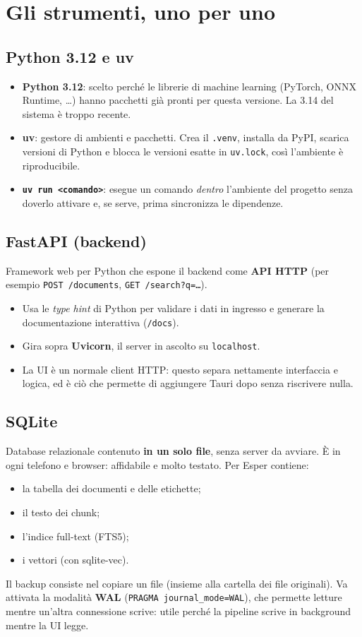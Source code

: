 \documentclass[11pt,a4paper]{article}
\newcommand{\code}[1]{\texttt{\small #1}}
\begin{document}
\section{Gli strumenti, uno per uno}

\subsection{Python 3.12 e uv}
\begin{itemize}
  \item \textbf{Python 3.12}: scelto perché le librerie di machine learning (PyTorch, ONNX Runtime, \dots) hanno pacchetti già pronti per questa versione. La 3.14 del sistema è troppo recente.
  \item \textbf{uv}: gestore di ambienti e pacchetti. Crea il \code{.venv}, installa da PyPI, scarica versioni di Python e blocca le versioni esatte in \code{uv.lock}, così l'ambiente è riproducibile.
  \item \textbf{\code{uv run <comando>}}: esegue un comando \emph{dentro} l'ambiente del progetto senza doverlo attivare e, se serve, prima sincronizza le dipendenze.
\end{itemize}

\subsection{FastAPI (backend)}
Framework web per Python che espone il backend come \textbf{API HTTP} (per esempio \code{POST /documents}, \code{GET /search?q=\dots}).
\begin{itemize}
  \item Usa le \emph{type hint} di Python per validare i dati in ingresso e generare la documentazione interattiva (\code{/docs}).
  \item Gira sopra \textbf{Uvicorn}, il server in ascolto su \code{localhost}.
  \item La UI è un normale client HTTP: questo separa nettamente interfaccia e logica, ed è ciò che permette di aggiungere Tauri dopo senza riscrivere nulla.
\end{itemize}

\subsection{SQLite}
Database relazionale contenuto \textbf{in un solo file}, senza server da avviare. È in ogni telefono e browser: affidabile e molto testato. Per Esper contiene:
\begin{itemize}
  \item la tabella dei documenti e delle etichette;
  \item il testo dei chunk;
  \item l'indice full-text (FTS5);
  \item i vettori (con sqlite-vec).
\end{itemize}
Il backup consiste nel copiare un file (insieme alla cartella dei file originali). Va attivata la modalità \textbf{WAL} (\code{PRAGMA journal\_mode=WAL}), che permette letture mentre un'altra connessione scrive: utile perché la pipeline scrive in background mentre la UI legge.
\end{document}
